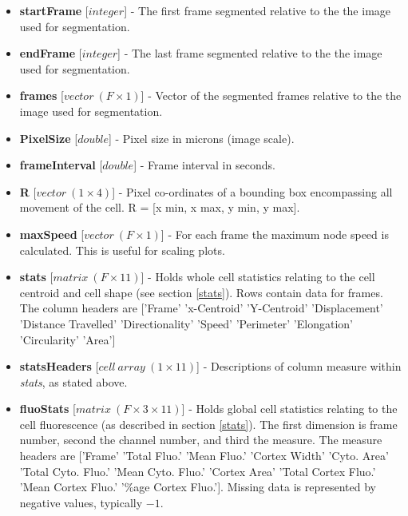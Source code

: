 \documentclass[a4paper,12pt]{article}
\begin{document}
\begin{itemize}
 \item \textbf{startFrame} [$integer$] - The first frame segmented relative to the the image used for segmentation.

 \item \textbf{endFrame} [$integer$] - The last frame segmented relative to the the image used for segmentation.

 \item \textbf{frames} [$vector~(F\times1)$] - Vector of the segmented frames relative to the the image used for segmentation.
 
  \item \textbf{PixelSize} [$double$] - Pixel size in microns (image scale).

 \item \textbf{frameInterval} [$double$] - Frame interval in seconds.
  
 \item \textbf{R} [$vector~(1\times4)$] - Pixel co-ordinates of a bounding box encompassing all movement of the cell.
 R = [x min, x max, y min, y max]. 
 
  \item \textbf{maxSpeed} [$vector~(F\times1)$] - For each frame the maximum node speed is calculated.
  This is useful for scaling plots.

 \item \textbf{stats} [$matrix~(F\times11)$] - Holds whole cell statistics relating to the cell centroid and cell shape (see
 section \ref{stats}).  Rows contain data for frames.  The column headers are ['Frame'    'x-Centroid'    'Y-Centroid' 
 'Displacement'   'Distance Travelled'    'Directionality'  'Speed'    'Perimeter'    'Elongation'    'Circularity'    'Area']

  \item \textbf{statsHeaders} [$cell~array~(1\times11)$] - Descriptions of column measure within \textit{stats}, as stated above.
  
  \item \textbf{fluoStats} [$matrix~(F\times3\times11)$] - Holds global cell statistics relating to the cell fluorescence (as described in
 section \ref{stats}).  The first dimension is frame number,  second the channel number, and third the measure.  The 
 measure headers are ['Frame'    'Total Fluo.'    'Mean Fluo.'    'Cortex Width'    'Cyto. Area'    'Total Cyto. Fluo.'
  'Mean Cyto. Fluo.'    'Cortex Area'    'Total Cortex Fluo.'    'Mean Cortex Fluo.'    '\%age Cortex Fluo.'].  Missing data is represented
  by negative values, typically $-1$.
  

\end{itemize}
\end{document}
